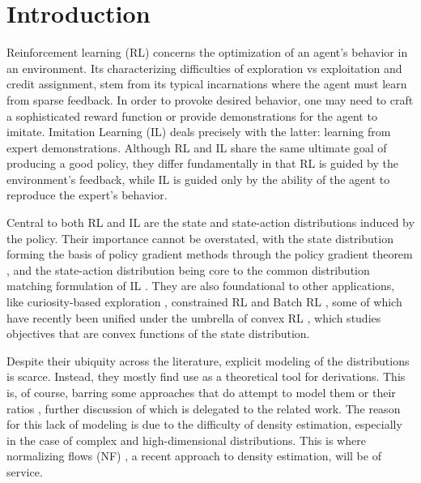 \section{Introduction}
Reinforcement learning (RL) \cite{sutton2018reinforcement} concerns the optimization of an agent's behavior in an environment. Its characterizing difficulties of exploration vs exploitation and credit assignment, stem from its typical incarnations where the agent must learn from sparse feedback. In order to provoke desired behavior, one may need to craft a sophisticated reward function or provide demonstrations for the agent to imitate. Imitation Learning (IL) deals precisely with the latter: learning from expert demonstrations. Although RL and IL share the same ultimate goal of producing a good policy, they differ fundamentally in that RL is guided by the environment’s feedback, while IL is guided only by the ability of the agent to reproduce the expert’s behavior.

Central to both RL and IL are the state and state-action distributions induced by the policy. Their importance cannot be overstated, with the state distribution forming the basis of policy gradient methods through the policy gradient theorem \cite{sutton2000policy}, and the state-action distribution being core to the common distribution matching formulation of IL \cite{ke2020imitation, ghasemipour2020divergence}. They are also foundational to other applications, like curiosity-based exploration \cite{pathak2017curiosity}, constrained RL \cite{qin2021density} and Batch RL \cite{fujimoto2019off}, some of which have recently been unified under the umbrella of convex RL \cite{zhang2020variational,zahavy2021reward,mutti2022challenging}, which studies objectives that are convex functions of the state distribution.  

Despite their ubiquity across the literature, explicit modeling of the distributions is scarce. Instead, they mostly find use as a theoretical tool for derivations. This is, of course, barring some approaches that do attempt to model them \cite{hazan2019provably,qin2021density,lee2019efficient,kim2021imitation} or their ratios \cite{nachum2019dualdice,liu2018breaking,gangwani2020harnessing}, further discussion of which is delegated to the related work. The reason for this lack of modeling is due to the difficulty of density estimation, especially in the case of complex and high-dimensional distributions. This is where normalizing flows (NF) \cite{dinh2014nice,dinh2016density, papamakarios2017masked}, a recent approach to density estimation, will be of service. 


